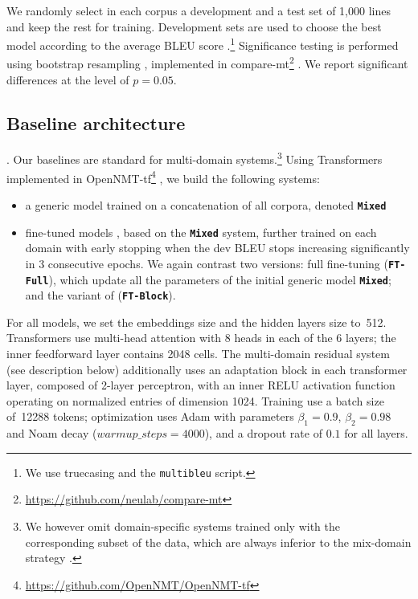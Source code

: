 \documentclass[11pt,a4paper]{article}
\newcommand{\fyTodo}[1]{\Todo[FY:]{\textcolor{orange}{#1}}}
\newcommand{\fyDone}[1]{\done[FY]\Todo[FY:]{\textcolor{orange}{#1}}}
\newcommand{\system}[1]{\texttt{\textbf{#1}}}
\begin{document}
We randomly select in each corpus a development and a test set of 1,000 lines and keep the rest for training. Development sets are used to choose the best model according to the average BLEU score \cite{Papineni02bleu}.\footnote{We use truecasing and the \texttt{multibleu} script.}\fyDone{A word about meta-parameter settings} Significance testing is performed using bootstrap resampling \cite{Koehn04statistical}, implemented in compare-mt\footnote{\url{https://github.com/neulab/compare-mt}} \cite{Neubig19compare-mt}. We report significant differences at the level of $p=0.05$.\fyDone{Fix correct p value}

\subsection{Baseline architecture \label{ssec:baseline}}
\fyTodo{Write this - settings and parameters for Mix-Nat and Full-FT}.
Our baselines are standard for multi-domain systems.\footnote{We however omit domain-specific systems trained only with the corresponding subset of the data, which are always inferior to the mix-domain strategy \cite{Britz17mixing}.} Using Transformers \cite{Vaswani17attention} implemented in OpenNMT-tf\footnote{\url{https://github.com/OpenNMT/OpenNMT-tf}} \cite{Klein17opennmt}, we build the following systems:
\begin{itemize}
\item a generic model trained on a concatenation of all corpora, denoted \system{Mixed}\fyTodo{Or mixed nat ?}
\item fine-tuned models \cite{Luong15stanford,Freitag16fast}, based on the \system{Mixed} system, further trained on each domain with early stopping when the dev BLEU stops increasing significantly in 3 consecutive epochs. We again contrast two versions: full fine-tuning (\system{FT-Full}), which update all the parameters of the initial generic model \system{Mixed}; and the variant of \cite{Bapna19simple} (\system{FT-Block}).
\end{itemize}

For all models, we set the embeddings size and the hidden layers size to~512. Transformers use multi-head attention with 8 heads in each of the 6 layers; the inner feedforward layer contains 2048 cells. The multi-domain residual system (see description below) additionally uses an adaptation block in each transformer layer, composed of 2-layer perceptron, with an inner RELU activation function operating on normalized entries of dimension 1024. 
Training use a batch size of~12288 tokens; optimization uses Adam with parameters $\beta_1=0.9$, $\beta_2= 0.98$ and Noam decay ($warmup\_steps=4000$), and a dropout rate of $0.1$ for all layers.\fyDone{Describe the block adaptation layer - voir slides}
\end{document}
